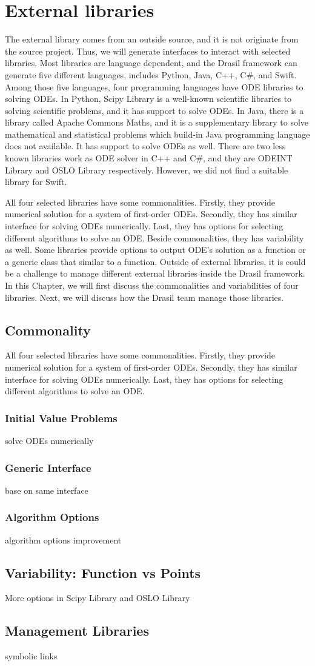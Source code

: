 \chapter{External libraries}
The external library comes from an outside source, and it is not originate from the source project. Thus, we will generate interfaces to interact with selected libraries. Most libraries are language dependent, and the Drasil framework can generate five different languages, includes Python, Java, C++, C\#, and Swift. Among those five languages, four programming languages have ODE libraries to solving ODEs. In Python, Scipy Library is a well-known scientific libraries to solving scientific problems, and it has support to solve ODEs. In Java, there is a library called Apache Commons Maths, and it is a supplementary library to solve mathematical and statistical problems which build-in Java programming language does not available. It has support to solve ODEs as well. There are two less known libraries work as ODE solver in C++ and C\#, and they are ODEINT Library and OSLO Library respectively. However, we did not find a suitable library for Swift. 

All four selected libraries have some commonalities. Firstly, they provide numerical solution for a system of first-order ODEs. Secondly, they has similar interface for solving ODEs numerically. Last, they has options for selecting different algorithms to solve an ODE. Beside commonalities, they has variability as well. Some libraries provide options to output ODE's solution as a function or a generic class that similar to a function. Outside of external libraries, it is could be a challenge to manage different external libraries inside the Drasil framework. In this Chapter, we will first discuss the commonalities and variabilities of four libraries. Next, we will discuss how the Drasil team manage those libraries.

\section{Commonality}
All four selected libraries have some commonalities. Firstly, they provide numerical solution for a system of first-order ODEs. Secondly, they has similar interface for solving ODEs numerically. Last, they has options for selecting different algorithms to solve an ODE. 

\subsection{Initial Value Problems}
solve ODEs numerically
\subsection{Generic Interface}
base on same interface
\subsection{Algorithm Options}
algorithm options
improvement

\section{Variability: Function vs Points}


More options in Scipy Library and OSLO Library

\section{Management Libraries}
symbolic links